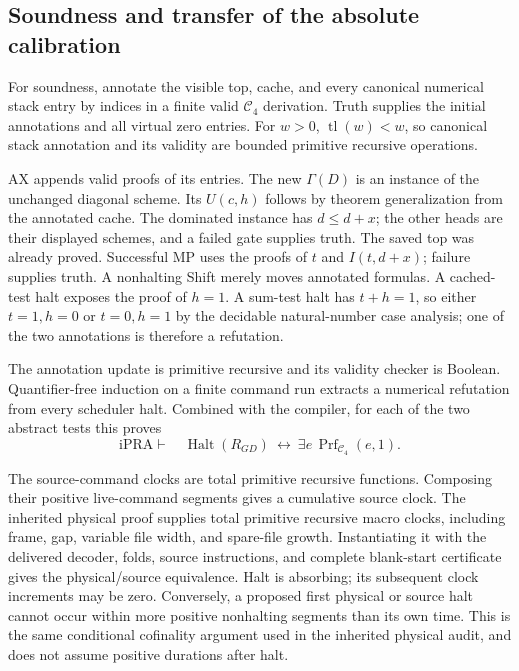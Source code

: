 \subsection{Soundness and transfer of the absolute calibration}

For soundness, annotate the visible top, cache, and every canonical
numerical stack entry by indices in a finite valid $\mathcal C_4$
derivation.  Truth supplies the initial annotations and all virtual
zero entries.  For $w>0$, $\operatorname{tl}(w)<w$, so canonical stack
annotation and its validity are bounded primitive recursive operations.

AX appends valid proofs of its entries.  The new $\Gamma(D)$ is an
instance of the unchanged diagonal scheme.  Its $U(c,h)$ follows by
theorem generalization from the annotated cache.  The dominated instance
has $d\le d+x$; the other heads are their displayed schemes, and a failed
gate supplies truth.  The saved top was already proved.  Successful MP
uses the proofs of $t$ and $I(t,d+x)$; failure supplies truth.  A
nonhalting Shift merely moves annotated formulas.  A cached-test halt
exposes the proof of $h=1$.  A sum-test halt has $t+h=1$, so either
$t=1,h=0$ or $t=0,h=1$ by the decidable natural-number case analysis;
one of the two annotations is therefore a refutation.

The annotation update is primitive recursive and its validity checker
is Boolean.  Quantifier-free induction on a finite command run extracts
a numerical refutation from every scheduler halt.  Combined with the
compiler, for each of the two abstract tests this proves
\[
 \mathrm{iPRA}\vdash\quad
 \operatorname{Halt}(R_{GD})\ \longleftrightarrow\
           \exists e\,\operatorname{Prf}_{\mathcal C_4}(e,1).
                                                        \tag{GD-Calc}\label{eq:gd-calc}
\]

The source-command clocks are total primitive recursive functions.
Composing their positive live-command segments gives a cumulative
source clock.  The inherited physical proof supplies total primitive
recursive macro clocks, including frame, gap, variable file width, and
spare-file growth.  Instantiating it with the delivered decoder, folds,
source instructions, and complete blank-start certificate gives the
physical/source equivalence.  Halt is absorbing; its subsequent clock
increments may be zero.  Conversely, a proposed first physical or
source halt cannot occur within more positive nonhalting segments than
its own time.  This is the same conditional cofinality argument used in
the inherited physical audit, and does not assume positive durations
after halt.

